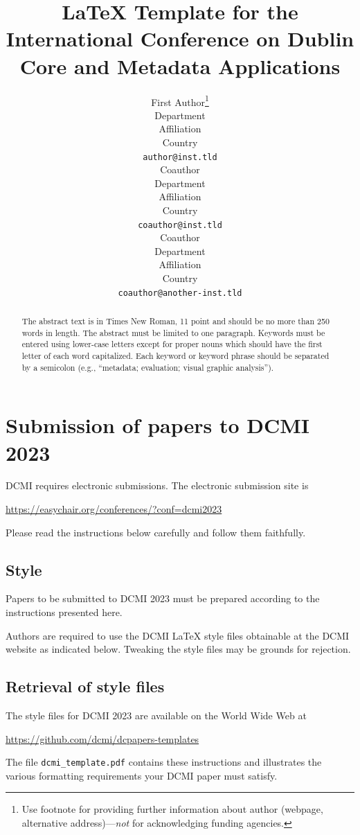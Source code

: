 \documentclass[11pt,a4paper]{article}
\title{\LaTeX{} Template for the International Conference on Dublin Core and Metadata Applications}
\author{%
  First Author\thanks{Use footnote for providing further information
    about author (webpage, alternative address)---\emph{not} for acknowledging
    funding agencies.} \\
  Department \\
  Affiliation\\
  Country \\
  \texttt{author@inst.tld} \\
  \And
  Coauthor \\
  Department \\
  Affiliation \\
  Country \\
  \texttt{coauthor@inst.tld} \\
  \And
  Coauthor \\
  Department \\
  Affiliation \\
  Country \\
  \texttt{coauthor@another-inst.tld} \\
}
\begin{document}
\maketitle

\begin{abstract}
  The abstract text is in Times New Roman, 11 point and should be no more than 250 words in length. The abstract must be limited to one paragraph. Keywords must be entered using lower-case letters except for proper nouns which should have the first letter of each word capitalized.  Each keyword or keyword phrase should be separated by a semicolon (e.g., “metadata; evaluation; visual graphic analysis”).
\end{abstract}


\setcounter{footnote}{0}

\section{Submission of papers to DCMI 2023}

DCMI requires electronic submissions.  The electronic submission site is
\begin{center}
  \url{https://easychair.org/conferences/?conf=dcmi2023}
\end{center}

Please read the instructions below carefully and follow them faithfully.

\subsection{Style}

Papers to be submitted to DCMI 2023 must be prepared according to the
instructions presented here.

Authors are required to use the DCMI \LaTeX{} style files obtainable at the
DCMI website as indicated below. Tweaking the style files may be grounds for
rejection.

\subsection{Retrieval of style files}

The style files for DCMI 2023 are available on
the World Wide Web at
\begin{center}
  \url{https://github.com/dcmi/dcpapers-templates}
\end{center}
The file \verb+dcmi_template.pdf+ contains these instructions and illustrates the
various formatting requirements your DCMI paper must satisfy.
\end{document}
